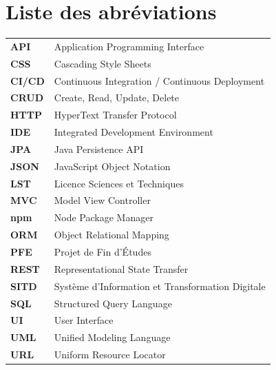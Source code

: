 \chapter*{Liste des abréviations}

\begin{tabular}{p{3cm} p{10cm}}

\textbf{API} & Application Programming Interface \\[0.3cm]
\textbf{CSS} & Cascading Style Sheets \\[0.3cm]
\textbf{CI/CD} & Continuous Integration / Continuous Deployment \\[0.3cm]
\textbf{CRUD} & Create, Read, Update, Delete \\[0.3cm]
\textbf{HTTP} & HyperText Transfer Protocol \\[0.3cm]
\textbf{IDE} & Integrated Development Environment \\[0.3cm]
\textbf{JPA} & Java Persistence API \\[0.3cm]
\textbf{JSON} & JavaScript Object Notation \\[0.3cm]
\textbf{LST} & Licence Sciences et Techniques \\[0.3cm]
\textbf{MVC} & Model View Controller \\[0.3cm]
\textbf{npm} & Node Package Manager \\[0.3cm]
\textbf{ORM} & Object Relational Mapping \\[0.3cm]
\textbf{PFE} & Projet de Fin d'Études \\[0.3cm]
\textbf{REST} & Representational State Transfer \\[0.3cm]
\textbf{SITD} & Système d'Information et Transformation Digitale \\[0.3cm]
\textbf{SQL} & Structured Query Language \\[0.3cm]
\textbf{UI} & User Interface \\[0.3cm]
\textbf{UML} & Unified Modeling Language \\[0.3cm]
\textbf{URL} & Uniform Resource Locator \\[0.3cm]

\end{tabular}
